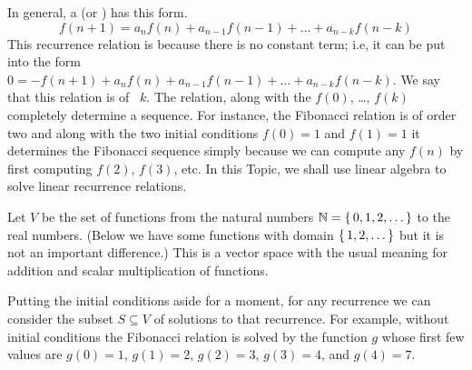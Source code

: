 In general, a 
(or )
has this form.
\begin{equation*}
  f(n+1)=a_nf(n)+a_{n-1}f(n-1)+\dots+a_{n-k}f(n-k)
\end{equation*}
This recurrence relation is 
because there is no constant term; i.e, it can be put into
the form $0=-f(n+1)+a_nf(n)+a_{n-1}f(n-1)+\dots+a_{n-k}f(n-k)$.
We say that this relation is of 
~$k$.
The relation, along with the 
$f(0)$, \ldots, $f(k)$
completely determine a sequence.
For instance, 
the Fibonacci relation is of order two and  
along with the two initial conditions $f(0)=1$ and $f(1)=1$ it
determines the Fibonacci sequence simply because 
we can compute any $f(n)$ by first computing $f(2)$, $f(3)$, etc.
In this Topic, we shall use linear algebra to solve linear
recurrence relations.

Let $V$ be the set of functions
from the natural numbers $\mathbb{N}=\mbox{$\{\,0,1,2,\ldots\,\}$}$ to the real numbers.
(Below we have some functions with domain $\mbox{$\{\,1,2,\ldots\,\}$}$
but it is not an important difference.)
This is a vector space with the usual meaning for addition and
scalar multiplication of functions.

Putting the initial conditions aside for a moment,
for any recurrence we can consider the subset $S\subseteq V$ of solutions
to that recurrence. 
For example, without initial conditions the Fibonacci relation 
is solved by the function $g$ whose 
first few values are $g(0)=1$, $g(1)=2$, $g(2)=3$, $g(3)=4$, and
$g(4)=7$.

